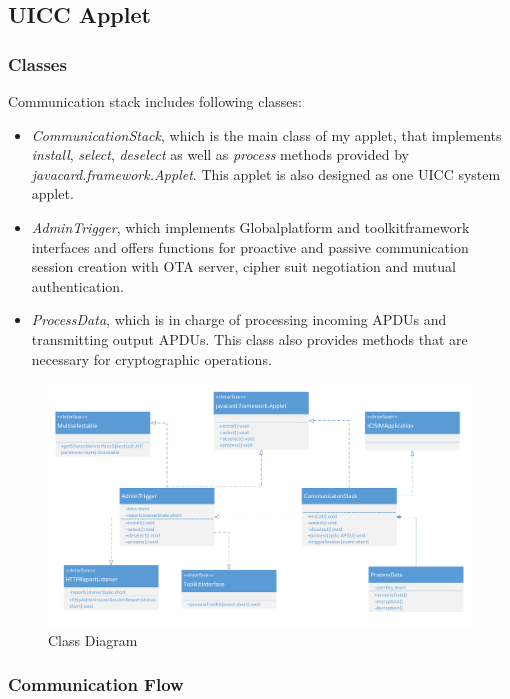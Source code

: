 \documentclass[]{llncs}
\begin{document}
\subsection{UICC Applet}

\subsubsection{Classes}
Communication stack includes following classes:
 \begin{itemize}
  \item  \emph{CommunicationStack}, which is the main class of my applet, that implements \emph{install}, \emph{select}, \emph{deselect} as well as \emph{process} methods provided by \emph{javacard.framework.Applet}. This applet is also  designed as one UICC system applet.
  \item  \emph{AdminTrigger}, which implements Globalplatform  and toolkitframework interfaces and offers functions for proactive and passive communication session creation with OTA server, cipher suit negotiation and mutual authentication.
 \item  \emph{ProcessData}, which is in charge of processing incoming APDUs and transmitting output APDUs. This class also provides methods that are necessary for cryptographic operations.
\end{itemize}

\begin{figure}[!htbp]
	\centering
	\includegraphics[width=1.0\textwidth]{class}
		\caption[ ]{Class Diagram}
	\label{fig:class}
\end{figure}

\subsubsection {Communication Flow}
\end{document}
